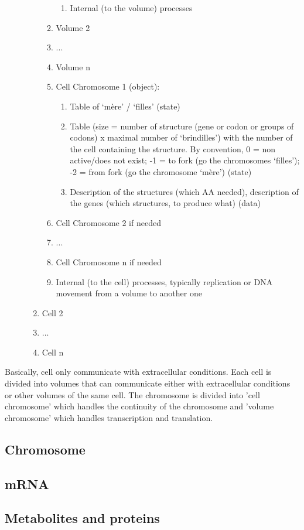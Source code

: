 \begin{description}
\begin{enumerate}
\begin{enumerate}
\begin{enumerate}
        \item Internal (to the volume) processes
      \end{enumerate}
      \item Volume 2
      \item ...
      \item Volume n
      \item Cell Chromosome 1 (object):
      \begin{enumerate}
        \item Table of ‘mère’ / ‘filles’ (state)
        \item Table (size = number of structure (gene or codon or groups of codons) x maximal number of ‘brindilles’) with the number of the cell containing the structure. By convention, 0 = non active/does not exist; -1 = to fork (go the chromosomes ‘filles’); -2 = from fork (go the chromosome ‘mère’) (state)
        \item Description of the structures (which AA needed), description of the genes (which structures, to produce what) (data)
      \end{enumerate}
      \item Cell Chromosome 2 if needed
      \item ...
      \item Cell Chromosome n if needed
      \item Internal (to the cell) processes, typically replication or DNA movement from a volume to another one
      \end{enumerate}
    \item Cell 2
    \item ...
    \item Cell n
  \end{enumerate}
\end{description}
Basically, cell only communicate with extracellular conditions. Each cell is divided into volumes that can communicate either with extracellular conditions or other volumes of the same cell. The chromosome is divided into 'cell chromosome' which handles the continuity of the chromosome and 'volume chromosome' which handles transcription and translation.



\subsection{Chromosome}


\subsection{mRNA}


\subsection{Metabolites and proteins}




